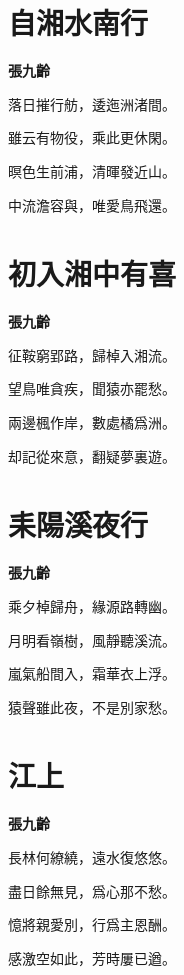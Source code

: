 \documentclass[12pt,a4paper]{ctexbook}
\begin{document}
\section{自湘水南行}
\textbf{張九齡}\par\vspace{0.5em}
落日摧行舫，逶迤洲渚間。\par
雖云有物役，乘此更休閑。\par
暝色生前浦，清暉發近山。\par
中流澹容與，唯愛鳥飛還。\par

\section{初入湘中有喜}
\textbf{張九齡}\par\vspace{0.5em}
征鞍窮郢路，歸棹入湘流。\par
望鳥唯貪疾，聞猿亦罷愁。\par
兩邊楓作岸，數處橘爲洲。\par
却記從來意，翻疑夢裏遊。\par

\section{耒陽溪夜行}
\textbf{張九齡}\par\vspace{0.5em}
乘夕棹歸舟，緣源路轉幽。\par
月明看嶺樹，風靜聽溪流。\par
嵐氣船間入，霜華衣上浮。\par
猿聲雖此夜，不是別家愁。\par

\section{江上}
\textbf{張九齡}\par\vspace{0.5em}
長林何繚繞，遠水復悠悠。\par
盡日餘無見，爲心那不愁。\par
憶將親愛別，行爲主恩酬。\par
感激空如此，芳時屢已遒。\par
\end{document}

